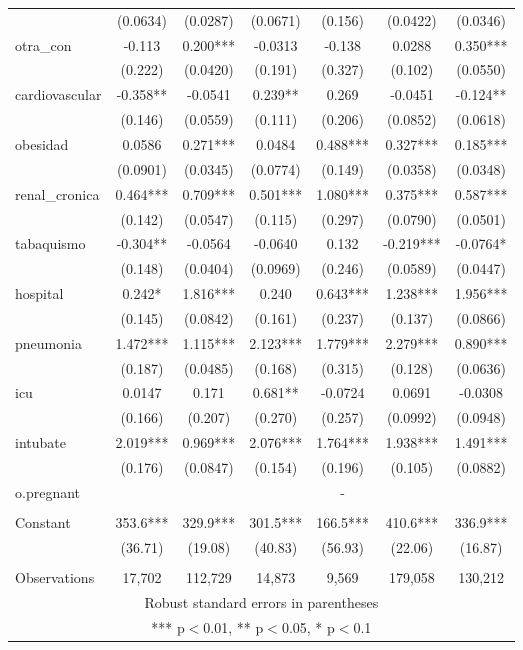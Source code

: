\documentclass[]{article}
\begin{document}
\begin{tabular}{lcccccc}
 & (0.0634) & (0.0287) & (0.0671) & (0.156) & (0.0422) & (0.0346) \\
otra\_con & -0.113 & 0.200*** & -0.0313 & -0.138 & 0.0288 & 0.350*** \\
 & (0.222) & (0.0420) & (0.191) & (0.327) & (0.102) & (0.0550) \\
cardiovascular & -0.358** & -0.0541 & 0.239** & 0.269 & -0.0451 & -0.124** \\
 & (0.146) & (0.0559) & (0.111) & (0.206) & (0.0852) & (0.0618) \\
obesidad & 0.0586 & 0.271*** & 0.0484 & 0.488*** & 0.327*** & 0.185*** \\
 & (0.0901) & (0.0345) & (0.0774) & (0.149) & (0.0358) & (0.0348) \\
renal\_cronica & 0.464*** & 0.709*** & 0.501*** & 1.080*** & 0.375*** & 0.587*** \\
 & (0.142) & (0.0547) & (0.115) & (0.297) & (0.0790) & (0.0501) \\
tabaquismo & -0.304** & -0.0564 & -0.0640 & 0.132 & -0.219*** & -0.0764* \\
 & (0.148) & (0.0404) & (0.0969) & (0.246) & (0.0589) & (0.0447) \\
hospital & 0.242* & 1.816*** & 0.240 & 0.643*** & 1.238*** & 1.956*** \\
 & (0.145) & (0.0842) & (0.161) & (0.237) & (0.137) & (0.0866) \\
pneumonia & 1.472*** & 1.115*** & 2.123*** & 1.779*** & 2.279*** & 0.890*** \\
 & (0.187) & (0.0485) & (0.168) & (0.315) & (0.128) & (0.0636) \\
icu & 0.0147 & 0.171 & 0.681** & -0.0724 & 0.0691 & -0.0308 \\
 & (0.166) & (0.207) & (0.270) & (0.257) & (0.0992) & (0.0948) \\
intubate & 2.019*** & 0.969*** & 2.076*** & 1.764*** & 1.938*** & 1.491*** \\
 & (0.176) & (0.0847) & (0.154) & (0.196) & (0.105) & (0.0882) \\
o.pregnant &  &  &  & - &  &  \\
 &  &  &  &  &  &  \\
Constant & 353.6*** & 329.9*** & 301.5*** & 166.5*** & 410.6*** & 336.9*** \\
 & (36.71) & (19.08) & (40.83) & (56.93) & (22.06) & (16.87) \\
 &  &  &  &  &  &  \\
 Observations & 17,702 & 112,729 & 14,873 & 9,569 & 179,058 & 130,212 \\ \hline
\multicolumn{7}{c}{ Robust standard errors in parentheses} \\
\multicolumn{7}{c}{ *** p$<$0.01, ** p$<$0.05, * p$<$0.1} \\
\end{tabular}
\end{document}
